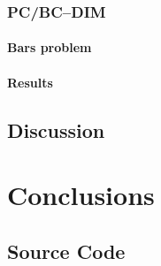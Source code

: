 \documentclass[11pt,a4paper]{report}
\begin{document}
			\subsection{PC/BC--DIM}
				\subsubsection{Bars problem}
				
				
				\subsubsection{Results}
		
		\section{Discussion}
		
	\chapter{Conclusions}
	
	
	
	\nocite{*}
	
	\begin{appendices}
		\chapter{Source Code}
	\end{appendices}
\end{document}

